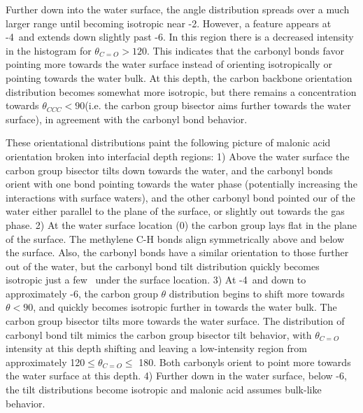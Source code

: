 Further down into the water surface, the angle distribution spreads over a much larger range until becoming isotropic near -2\angs. However, a feature appears at -4\angs~and extends down slightly past -6\angs. In this region there is a decreased intensity in the histogram for $\theta_{C=O} > 120$\textdegree. This indicates that the carbonyl bonds favor pointing more towards the water surface instead of orienting isotropically or pointing towards the water bulk. At this depth, the carbon backbone orientation distribution becomes somewhat more isotropic, but there remains a concentration towards $\theta_{CCC} < 90$\textdegree (i.e. the carbon group bisector aims further towards the water surface), in agreement with the carbonyl bond behavior.

These orientational distributions paint the following picture of malonic acid orientation broken into interfacial depth regions: 1) Above the water surface the carbon group bisector tilts down towards the water, and the carbonyl bonds orient with one bond pointing towards the water phase (potentially increasing the interactions with surface waters), and the other carbonyl bond pointed our of the water either parallel to the plane of the surface, or slightly out towards the gas phase. 2) At the water surface location (0\angs) the carbon group lays flat in the plane of the surface. The methylene C-H bonds align symmetrically above and below the surface. Also, the carbonyl bonds have a similar orientation to those further out of the water, but the carbonyl bond tilt distribution quickly becomes isotropic just a few \angs~under the surface location. 3) At -4\angs~and down to approximately -6\angs, the carbon group $\theta$ distribution begins to shift more towards $\theta<90$\textdegree, and quickly becomes isotropic further in towards the water bulk. The carbon group bisector tilts more towards the water surface. The distribution of carbonyl bond tilt mimics the carbon group bisector tilt behavior, with $\theta_{C=O}$ intensity at this depth shifting and leaving a low-intensity region from approximately 120\textdegree $\le \theta_{C=O} \le$ 180\textdegree. Both carbonyls orient to point more towards the water surface at this depth. 4) Further down in the water surface, below -6\angs, the tilt distributions become isotropic and malonic acid assumes bulk-like behavior.
